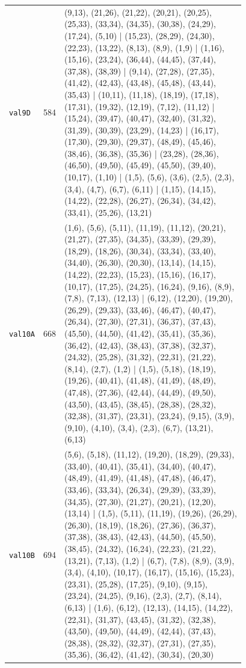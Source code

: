 \begin{landscape}
\begin{longtable}{lr>{\tiny\raggedright\arraybackslash}p{0.78\linewidth}}
\texttt{val9D} & 584 & (9,13), (21,26), (21,22), (20,21), (20,25), (25,33), (33,34), (34,35), (30,38), (24,29), (17,24), (5,10) | (15,23), (28,29), (24,30), (22,23), (13,22), (8,13), (8,9), (1,9) | (1,16), (15,16), (23,24), (36,44), (44,45), (37,44), (37,38), (38,39) | (9,14), (27,28), (27,35), (41,42), (42,43), (43,48), (45,48), (43,44), (35,43) | (10,11), (11,18), (18,19), (17,18), (17,31), (19,32), (12,19), (7,12), (11,12) | (15,24), (39,47), (40,47), (32,40), (31,32), (31,39), (30,39), (23,29), (14,23) | (16,17), (17,30), (29,30), (29,37), (48,49), (45,46), (38,46), (36,38), (35,36) | (23,28), (28,36), (46,50), (49,50), (45,49), (45,50), (39,40), (10,17), (1,10) | (1,5), (5,6), (3,6), (2,5), (2,3), (3,4), (4,7), (6,7), (6,11) | (1,15), (14,15), (14,22), (22,28), (26,27), (26,34), (34,42), (33,41), (25,26), (13,21) \\[2pt]
\texttt{val10A} & 668 & (1,6), (5,6), (5,11), (11,19), (11,12), (20,21), (21,27), (27,35), (34,35), (33,39), (29,39), (18,29), (18,26), (30,34), (33,34), (33,40), (34,40), (26,30), (20,30), (13,14), (14,15), (14,22), (22,23), (15,23), (15,16), (16,17), (10,17), (17,25), (24,25), (16,24), (9,16), (8,9), (7,8), (7,13), (12,13) | (6,12), (12,20), (19,20), (26,29), (29,33), (33,46), (46,47), (40,47), (26,34), (27,30), (27,31), (36,37), (37,43), (45,50), (44,50), (41,42), (35,41), (35,36), (36,42), (42,43), (38,43), (37,38), (32,37), (24,32), (25,28), (31,32), (22,31), (21,22), (8,14), (2,7), (1,2) | (1,5), (5,18), (18,19), (19,26), (40,41), (41,48), (41,49), (48,49), (47,48), (27,36), (42,44), (44,49), (49,50), (43,50), (43,45), (38,45), (28,38), (28,32), (32,38), (31,37), (23,31), (23,24), (9,15), (3,9), (9,10), (4,10), (3,4), (2,3), (6,7), (13,21), (6,13) \\[2pt]
\texttt{val10B} & 694 & (5,6), (5,18), (11,12), (19,20), (18,29), (29,33), (33,40), (40,41), (35,41), (34,40), (40,47), (48,49), (41,49), (41,48), (47,48), (46,47), (33,46), (33,34), (26,34), (29,39), (33,39), (34,35), (27,30), (21,27), (20,21), (12,20), (13,14) | (1,5), (5,11), (11,19), (19,26), (26,29), (26,30), (18,19), (18,26), (27,36), (36,37), (37,38), (38,43), (42,43), (44,50), (45,50), (38,45), (24,32), (16,24), (22,23), (21,22), (13,21), (7,13), (1,2) | (6,7), (7,8), (8,9), (3,9), (3,4), (4,10), (10,17), (16,17), (15,16), (15,23), (23,31), (25,28), (17,25), (9,10), (9,15), (23,24), (24,25), (9,16), (2,3), (2,7), (8,14), (6,13) | (1,6), (6,12), (12,13), (14,15), (14,22), (22,31), (31,37), (43,45), (31,32), (32,38), (43,50), (49,50), (44,49), (42,44), (37,43), (28,38), (28,32), (32,37), (27,31), (27,35), (35,36), (36,42), (41,42), (30,34), (20,30) \\[2pt]

\end{longtable}
\end{landscape}
